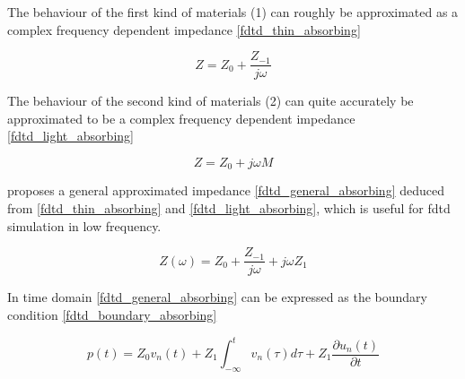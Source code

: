 The behaviour of the first kind of materials (1) can roughly be approximated as a complex frequency dependent impedance \autoref{fdtd_thin_absorbing}

\begin{equation}\label{fdtd_thin_absorbing}
Z= Z_0+\frac{Z_{-1}}{j\omega}
\end{equation}

         \startexplain
    \stopexplain

The behaviour of the second kind of materials (2) can quite accurately be approximated to be a complex frequency dependent impedance \autoref{fdtd_light_absorbing}

\begin{equation}\label{fdtd_light_absorbing}
Z= Z_0+j\omega M
\end{equation}

         \startexplain
    \stopexplain

 \citep{finiteproblems} proposes a general approximated impedance \autoref{fdtd_general_absorbing} deduced from \autoref{fdtd_thin_absorbing} and \autoref{fdtd_light_absorbing}, which is useful for \gls{fdtd} simulation in low frequency.

\begin{equation}\label{fdtd_general_absorbing}
Z(\omega)= Z_0+\frac{Z_{-1}}{j\omega}+j\omega Z_1
\end{equation}

         \startexplain
    \stopexplain
    
In time domain \autoref{fdtd_general_absorbing} can be expressed as the boundary condition \autoref{fdtd_boundary_absorbing}

\begin{equation}\label{fdtd_boundary_absorbing}
p(t)= Z_0v_n(t)+Z_1\int_{-\infty}^{t} v_n(\tau)d\tau +Z_1\frac{\partial u_n(t)}{\partial t} 
\end{equation}

         \startexplain
    \stopexplain


